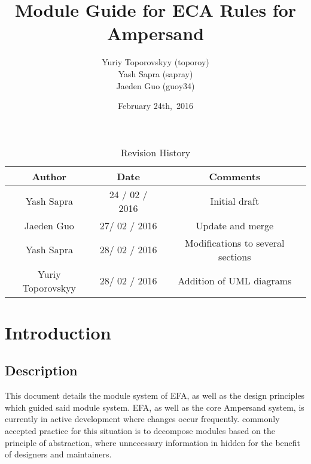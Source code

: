 \documentclass[12pt, svgnames]{article}
\begin{document}
\title{\vspace*{3cm} Module Guide for ECA Rules for Ampersand} 
\author{Yuriy Toporovskyy (toporoy)\\ Yash Sapra (sapray) \\ Jaeden Guo (guoy34)}
\date{February 24th,\ 2016} 


\maketitle
\newpage
\vspace*{1cm}
\begin{table}[ht!]\begin{center}
        \caption{Revision History}  
        \begin{tabular}{|c|c|c|}\hline
            \textbf{Author} & \textbf{Date} & \textbf{Comments} \\\hline 
            Yash Sapra & 24 / 02 / 2016 & Initial draft\\\hline
	 Jaeden Guo & 27/ 02 / 2016 & Update and merge \\\hline
	 Yash Sapra & 28/ 02 / 2016 & Modifications to several sections \\\hline
	 Yuriy Toporovskyy & 28/ 02 / 2016 & Addition of UML diagrams \\\hline
        \end{tabular}
    \end{center}\end{table}
\newpage

\tableofcontents

\newpage

\section{Introduction}
\subsection{Description}

This document details the module system of EFA, as well as the design principles
which guided said module system. EFA, as well as the core Ampersand system, is
currently in active development where changes occur frequently.  commonly
accepted practice for this situation is to decompose modules based on the
principle of abstraction, where unnecessary information in hidden for the
benefit of designers and maintainers\citep{modStruct,Parnas1972}.
\end{document}
